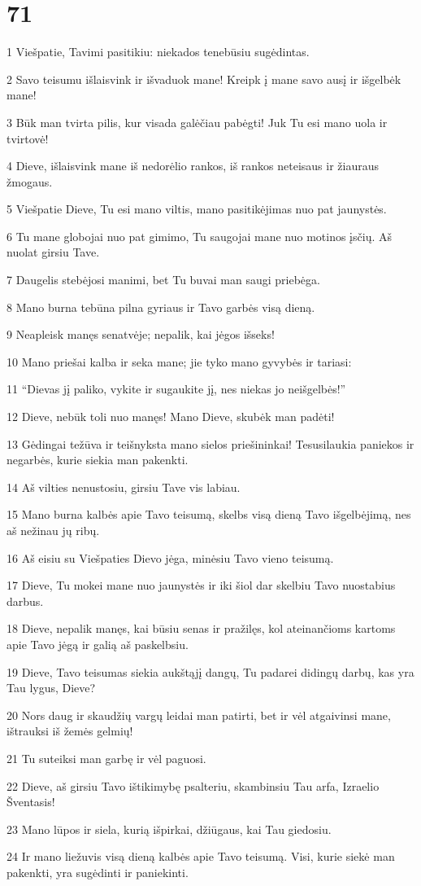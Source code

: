 \chapter{71}


\par 1 Viešpatie, Tavimi pasitikiu: niekados tenebūsiu sugėdintas. 
\par 2 Savo teisumu išlaisvink ir išvaduok mane! Kreipk į mane savo ausį ir išgelbėk mane! 
\par 3 Būk man tvirta pilis, kur visada galėčiau pabėgti! Juk Tu esi mano uola ir tvirtovė! 
\par 4 Dieve, išlaisvink mane iš nedorėlio rankos, iš rankos neteisaus ir žiauraus žmogaus. 
\par 5 Viešpatie Dieve, Tu esi mano viltis, mano pasitikėjimas nuo pat jaunystės. 
\par 6 Tu mane globojai nuo pat gimimo, Tu saugojai mane nuo motinos įsčių. Aš nuolat girsiu Tave. 
\par 7 Daugelis stebėjosi manimi, bet Tu buvai man saugi priebėga. 
\par 8 Mano burna tebūna pilna gyriaus ir Tavo garbės visą dieną. 
\par 9 Neapleisk manęs senatvėje; nepalik, kai jėgos išseks! 
\par 10 Mano priešai kalba ir seka mane; jie tyko mano gyvybės ir tariasi: 
\par 11 “Dievas jį paliko, vykite ir sugaukite jį, nes niekas jo neišgelbės!” 
\par 12 Dieve, nebūk toli nuo manęs! Mano Dieve, skubėk man padėti! 
\par 13 Gėdingai težūva ir teišnyksta mano sielos priešininkai! Tesusilaukia paniekos ir negarbės, kurie siekia man pakenkti. 
\par 14 Aš vilties nenustosiu, girsiu Tave vis labiau. 
\par 15 Mano burna kalbės apie Tavo teisumą, skelbs visą dieną Tavo išgelbėjimą, nes aš nežinau jų ribų. 
\par 16 Aš eisiu su Viešpaties Dievo jėga, minėsiu Tavo vieno teisumą. 
\par 17 Dieve, Tu mokei mane nuo jaunystės ir iki šiol dar skelbiu Tavo nuostabius darbus. 
\par 18 Dieve, nepalik manęs, kai būsiu senas ir pražilęs, kol ateinančioms kartoms apie Tavo jėgą ir galią aš paskelbsiu. 
\par 19 Dieve, Tavo teisumas siekia aukštąjį dangų, Tu padarei didingų darbų, kas yra Tau lygus, Dieve? 
\par 20 Nors daug ir skaudžių vargų leidai man patirti, bet ir vėl atgaivinsi mane, ištrauksi iš žemės gelmių! 
\par 21 Tu suteiksi man garbę ir vėl paguosi. 
\par 22 Dieve, aš girsiu Tavo ištikimybę psalteriu, skambinsiu Tau arfa, Izraelio Šventasis! 
\par 23 Mano lūpos ir siela, kurią išpirkai, džiūgaus, kai Tau giedosiu. 
\par 24 Ir mano liežuvis visą dieną kalbės apie Tavo teisumą. Visi, kurie siekė man pakenkti, yra sugėdinti ir paniekinti.



